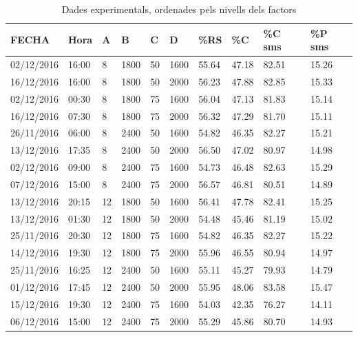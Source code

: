 \documentclass[a4paper]{article}
\begin{document}
\begin{table}[H]
	\centering
	\begin{tabular}{ l | l | l | l | l | l | l | l | l | l }
		\rowcolor{gray!50}
		FECHA & Hora & A & B & C & D & \%RS & \%C & \%C sms & \%P sms \\ \hline
		02/12/2016 & 16:00 & 8 & 1800 & 50 & 1600 & 55.64 & 47.18 & 82.51 & 15.26 \\ 
		16/12/2016 & 16:00 & 8 & 1800 & 50 & 2000 & 56.23 & 47.88 & 82.85 & 15.33 \\ 
		02/12/2016 & 00:30 & 8 & 1800 & 75 & 1600 & 56.04 & 47.13 & 81.83 & 15.14 \\ 
		16/12/2016 & 07:30 & 8 & 1800 & 75 & 2000 & 56.32 & 47.29 & 81.70 & 15.11 \\ 
		26/11/2016 & 06:00 & 8 & 2400 & 50 & 1600 & 54.82 & 46.35 & 82.27 & 15.21 \\ 
		13/12/2016 & 17:35 & 8 & 2400 & 50 & 2000 & 56.50 & 47.02 & 80.97 & 14.98 \\ 
		02/12/2016 & 09:00 & 8 & 2400 & 75 & 1600 & 54.73 & 46.48 & 82.63 & 15.29 \\ 
		07/12/2016 & 15:00 & 8 & 2400 & 75 & 2000 & 56.57 & 46.81 & 80.51 & 14.89 \\ 
		13/12/2016 & 20:15 & 12 & 1800 & 50 & 1600 & 56.41 & 47.78 & 82.41 & 15.25 \\ 
		13/12/2016 & 01:30 & 12 & 1800 & 50 & 2000 & 54.48 & 45.46 & 81.19 & 15.02 \\ 
		25/11/2016 & 20:30 & 12 & 1800 & 75 & 1600 & 54.82 & 46.35 & 82.27 & 15.22 \\ 
		14/12/2016 & 19:30 & 12 & 1800 & 75 & 2000 & 55.96 & 46.55 & 80.94 & 14.97 \\ 
		25/11/2016 & 16:25 & 12 & 2400 & 50 & 1600 & 55.11 & 45.27 & 79.93 & 14.79 \\ 
		01/12/2016 & 17:45 & 12 & 2400 & 50 & 2000 & 55.95 & 48.06 & 83.58 & 15.47 \\ 
		15/12/2016 & 19:30 & 12 & 2400 & 75 & 1600 & 54.03 & 42.35 & 76.27 & 14.11 \\ 
		06/12/2016 & 15:00 & 12 & 2400 & 75 & 2000 & 55.29 & 45.86 & 80.70 & 14.93 \\ 
	\end{tabular}
	\caption{Dades experimentals, ordenades pels nivells dels factors}
	\label{tab:resultats}
\end{table}
\end{document}
